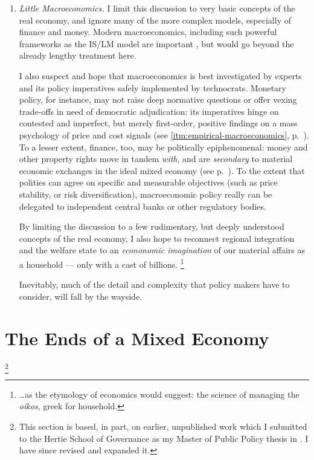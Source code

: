 \begin{enumerate}
	\item \label{itm:little-macroeconomics} \emph{Little Macroeconomics.}
		I limit this discussion to very basic concepts of the real economy, and ignore many of the more complex models, especially of finance and money.
		Modern macroeconomics, including such powerful frameworks as the IS/LM model are important \citep[originally][]{Hicks1937}, but would go beyond the already lengthy treatment here.

		I also suspect and hope that macroeconomics is best investigated by experts and its policy imperatives safely implemented by technocrats.
		Monetary policy, for instance, may not raise deep normative questions or offer vexing trade-offs in need of democratic adjudication:
its imperatives hinge on contested and imperfect, but merely first-order, positive findings on a mass psychology of price and cost signals (see \autoref{itm:empirical-macroeconomics}, p.~\pageref{itm:empirical-macroeconomics}).
		To a lesser extent, finance, too, may be politically epiphenomenal:
money and other property rights move in tandem \emph{with}, and are \emph{secondary} to material economic exchanges in the ideal mixed economy (see p.~\pageref{itm:epiphenomenal-finance}).
		To the extent that polities can agree on specific and measurable objectives (such as price stability, or risk diversification), macroeconomic policy really can be delegated to independent central banks or other regulatory bodies.

		By limiting the discussion to a few rudimentary, but deeply understood concepts of the real economy, I also hope to reconnect regional integration and the welfare state to an \emph{econonomic imagination} \citep[paraphrasing][]{Mills-1959-aa} of our material affairs as a household --- only with a cast of billions.
		\footnote{
			\ldots as the etymology of economics would suggest:
the science of managing the \emph{oikos}, greek for household.
		}

		Inevitably, much of the detail and complexity that policy makers have to consider, will fall by the wayside.
\end{enumerate}

\section[Ends]{The Ends of a Mixed Economy} \label{sec:ends}

\footnote{\label{fn:also-in-mpp}
	This section is based, in part, on earlier, unpublished work which I submitted to the Hertie School of Governance as my Master of Public Policy thesis in \citep{Held2010a}.
	I have since revised and expanded it.
}

